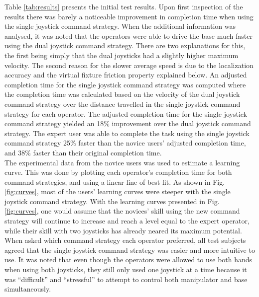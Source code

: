 \documentclass[onecolumn,10pt,final]{asme2ej}
\begin{document}
Table \ref{tab:results} presents the initial test results. Upon first inspection of the results there was barely a noticeable improvement in completion time when using the single joystick command strategy. When the additional information was analysed, it was noted that the operators were able to drive the base much faster using the dual joystick command strategy. There are two explanations for this, the first being simply that the dual joysticks had a slightly higher maximum velocity. The second reason for the slower average speed is due to the localization accuracy and the virtual fixture friction property explained below. An adjusted completion time for the single joystick command strategy was computed where the completion time was calculated based on the velocity of the dual joystick command strategy over the distance travelled in the single joystick command strategy for each operator. The adjusted completion time for the single joystick command strategy yielded an 18\% improvement over the dual joystick command strategy. The expert user was able to complete the task using the single joystick command strategy 25\% faster than the novice users' adjusted completion time, and 38\% faster than their original completion time.\\

The experimental data from the novice users was used to estimate a learning curve. This was done by plotting each operator's completion time for both command strategies, and using a linear line of best fit. As shown in Fig. \ref{fig:curves}, most of the users' learning curves were steeper with the single joystick command strategy. With the learning curves presented in Fig. \ref{fig:curves}, one would assume that the novices' skill using the new command strategy will continue to increase and reach a level equal to the expert operator, while their skill with two joysticks has already neared its maximum potential.\\

When asked which command strategy each operator preferred, all test subjects agreed that the single joystick command strategy was easier and more intuitive to use. It was noted that even though the operators were allowed to use both hands when using both joysticks, they still only used one joystick at a time because it was ``difficult'' and ``stressful'' to attempt to control both manipulator and base simultaneously.\\
\end{document}
